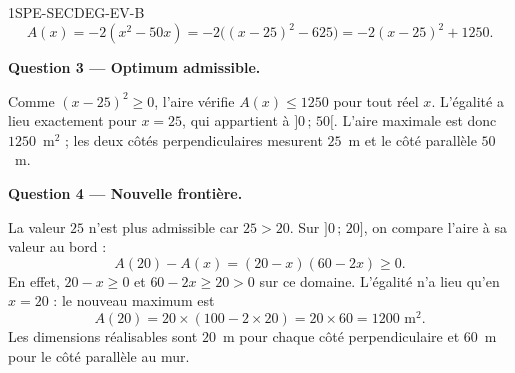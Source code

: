 \begin{corrige}{1SPE-SECDEG-EV-B}
\[A(x)=-2(x^2-50x)
=-2\bigl((x-25)^2-625\bigr)=-2(x-25)^2+1250.\]

\medskip
\textbf{Question 3 — Optimum admissible.}

Comme $(x-25)^2\geq0$, l'aire vérifie $A(x)\leq1250$ pour tout réel $x$.
L'égalité a lieu exactement pour $x=25$, qui appartient à $]0\,;\,50[$.
L'aire maximale est donc $1250$~m$^2$ ; les deux côtés perpendiculaires
mesurent $25$~m et le côté parallèle $50$~m.

\medskip
\textbf{Question 4 — Nouvelle frontière.}

La valeur $25$ n'est plus admissible car $25>20$.
Sur $]0\,;\,20]$, on compare l'aire à sa valeur au bord :
\[A(20)-A(x)=(20-x)(60-2x)\geq0.\]
En effet, $20-x\geq0$ et $60-2x\geq20>0$ sur ce domaine.
L'égalité n'a lieu qu'en $x=20$ : le nouveau maximum est
\[A(20)=20\times(100-2\times20)=20\times60=1200\text{ m}^2.\]
Les dimensions réalisables sont $20$~m pour chaque côté perpendiculaire
et $60$~m pour le côté parallèle au mur.

\end{corrige}
